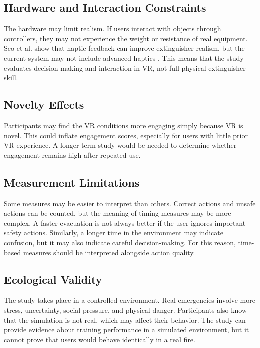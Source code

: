 \documentclass[manuscript, review]{acmart}
\begin{document}
{\subsection{Hardware and Interaction Constraints}

The hardware may limit realism. If users interact with objects through controllers, they may not experience the weight or resistance of real equipment. Seo et al. show that haptic feedback can improve extinguisher realism, but the current system may not include advanced haptics \cite{seo2019interactive}. This means that the study evaluates decision-making and interaction in VR, not full physical extinguisher skill.

\subsection{Novelty Effects}

Participants may find the VR conditions more engaging simply because VR is novel. This could inflate engagement scores, especially for users with little prior VR experience. A longer-term study would be needed to determine whether engagement remains high after repeated use.

\subsection{Measurement Limitations}

Some measures may be easier to interpret than others. Correct actions and unsafe actions can be counted, but the meaning of timing measures may be more complex. A faster evacuation is not always better if the user ignores important safety actions. Similarly, a longer time in the environment may indicate confusion, but it may also indicate careful decision-making. For this reason, time-based measures should be interpreted alongside action quality.

\subsection{Ecological Validity}

The study takes place in a controlled environment. Real emergencies involve more stress, uncertainty, social pressure, and physical danger. Participants also know that the simulation is not real, which may affect their behavior. The study can provide evidence about training performance in a simulated environment, but it cannot prove that users would behave identically in a real fire.

}
\end{document}
